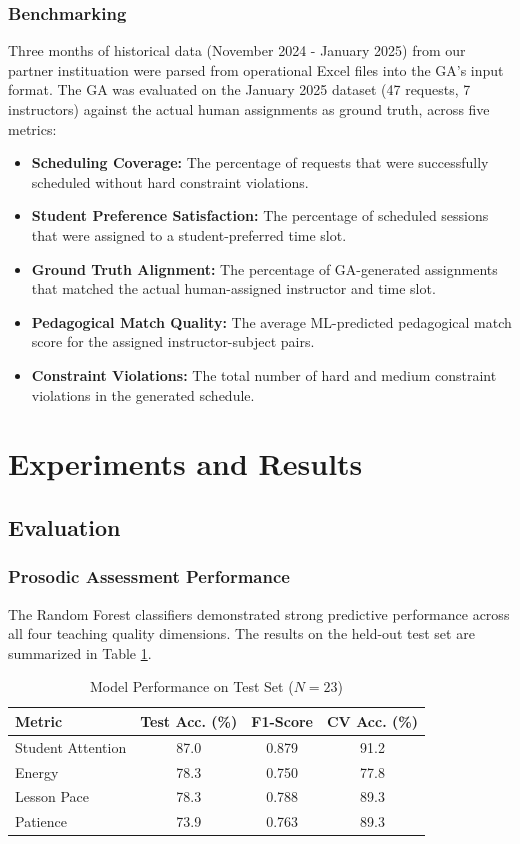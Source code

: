 \subsubsection{Benchmarking}
  Three months of historical data (November 2024 - January 2025) from our partner instituation were parsed from operational Excel files into the GA's input format. The   GA was evaluated on the January 2025 dataset (47 requests, 7 instructors) against the actual human assignments as ground truth, across five metrics:    
  \begin{itemize}
    \item \textbf{Scheduling Coverage:} The percentage of requests that were successfully scheduled without hard constraint violations.
    \item \textbf{Student Preference Satisfaction:} The percentage of scheduled sessions that were assigned to a student-preferred time slot.
    \item \textbf{Ground Truth Alignment:} The percentage of GA-generated assignments that matched the actual human-assigned instructor and time slot.
    \item \textbf{Pedagogical Match Quality:} The average ML-predicted pedagogical match score for the assigned instructor-subject pairs.
    \item \textbf{Constraint Violations:} The total number of hard and medium constraint violations in the generated schedule.
  \end{itemize}

\section{Experiments and Results}
\label{sec:results}

\subsection{Evaluation}
\subsubsection{Prosodic Assessment Performance}
The Random Forest classifiers demonstrated strong predictive performance across all four teaching quality dimensions. The results on the held-out test set are summarized in Table \ref{tab:results}.

\begin{table}[h]
\centering
\caption{Model Performance on Test Set ($N=23$)}
\label{tab:results}
\begin{tabular}{|l|c|c|c|}
\hline
\textbf{Metric} & \textbf{Test Acc. (\%)} & \textbf{F1-Score} & \textbf{CV Acc. (\%)} \\ \hline
Student Attention & 87.0 & 0.879 & 91.2 \\ \hline
Energy            & 78.3 & 0.750 & 77.8 \\ \hline
Lesson Pace       & 78.3 & 0.788 & 89.3 \\ \hline
Patience          & 73.9 & 0.763 & 89.3 \\ \hline
\end{tabular}
\end{table}

